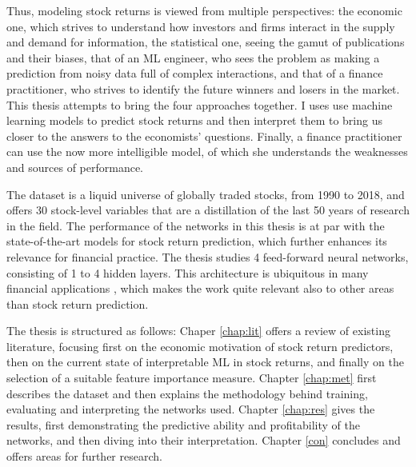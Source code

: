 Thus, modeling stock returns is viewed from multiple perspectives: the economic one, which strives to understand how investors and firms interact in the supply and demand for information, the statistical one, seeing the gamut of publications and their biases, that of an ML engineer, who sees the problem as making a prediction from noisy data full of complex interactions, and that of a finance practitioner, who strives to identify the future winners and losers in the market. This thesis attempts to bring the four approaches together. I uses use machine learning models to predict stock returns and then interpret them to bring us closer to the answers to the economists' questions. Finally, a finance practitioner can use the now more intelligible model, of which she understands the weaknesses and sources of performance.

The dataset is a liquid universe of globally traded stocks, from 1990 to 2018, and offers 30 stock-level variables that are a distillation of the last 50 years of research in the field. The performance of the networks in this thesis is at par with the state-of-the-art models for stock return prediction, which further enhances its relevance for financial practice. The thesis studies 4 feed-forward neural networks, consisting of 1 to 4 hidden layers. This architecture is ubiquitous in many financial applications \cite{fadlalla2001analysis}, which makes the work quite relevant also to other areas than stock return prediction.    

The thesis is structured as follows: Chaper \ref{chap:lit} offers a review of existing literature, focusing first on the economic motivation of stock return predictors, then on the current state of interpretable ML in stock returns, and finally on the selection of a suitable feature importance measure. Chapter \ref{chap:met} first describes the dataset and then explains the methodology behind training, evaluating and interpreting the networks used. Chapter \ref{chap:res} gives the results, first demonstrating the predictive ability and profitability of the networks, and then diving into their interpretation. Chapter \ref{con} concludes and offers areas for further research. 
